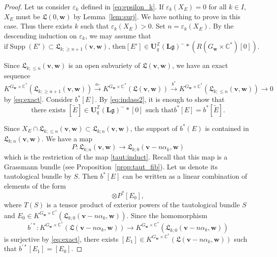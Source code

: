 \documentclass[12pt]{amsart}
\def\Bbb{\mathbb}
\def\frak{\mathfrak}
\theoremstyle{definition}
\theoremstyle{remark}
\numberwithin{equation}{subsection}
\newcommand{\lemref}[1]{Lemma~\ref{#1}}
\newcommand{\propref}[1]{Proposition~\ref{#1}}
\newcommand{\C}{{\Bbb C}}
\newcommand{\Z}{{\Bbb Z}}
\newcommand{\La}{{\frak L}} %
\newcommand{\bv}{{\mathbf v}} %
\newcommand{\bw}{{\mathbf w}} %
\newcommand{\Uli}{{\mathbf U}^{\Z}_q({\mathbf L}\mathfrak g)}
\begin{document}
\begin{proof}
Let us consider $\varepsilon_k$ defined in \eqref{eq:epsilon_k}. If
$\varepsilon_k(X_E) = 0$ for all $k\in I$, $X_E$ must be $\La(0,\bw)$
by \lemref{lem:surj}. We have nothing to prove in this case.  Thus
there exists $k$ such that $\varepsilon_k(X_E) > 0$. Set $n =
\varepsilon_k(X_E)$.
By the descending induction on $\varepsilon_k$, we may assume that
\begin{equation}
\label{eq:indass2}
\text{if
$\operatorname{Supp}(E')\subset \La_{k;\ge n+1}(\bv,\bw)$, then
$[E']\in \Uli^-\ast\left(R(G_\bw\times\C^*)[0]\right)$.}
\end{equation}

Since $\La_{k;\le n}(\bv,\bw)$ is an open
subvariety of $\La(\bv,\bw)$, we have an exact sequence
\begin{equation*}
   K^{G_\bw\times\C^*}(\La_{k;\ge n+1}(\bv,\bw))
    \xrightarrow{a_*}
   K^{G_\bw\times\C^*}(\La(\bv,\bw))
    \xrightarrow{b^*}
   K^{G_\bw\times\C^*}(\La_{k;\le n}(\bv,\bw))
    \to 0
\end{equation*}
by \eqref{eq:exact}.
%
Consider $b^*[E]$.
By \eqref{eq:indass2}, it is enough to show that
\begin{equation}
\label{eq:to_show}
\text{there exists $[\widetilde E]\in\Uli^-\ast[0]$ such that
$b^*[E] = b^*[\widetilde E]$.}
\end{equation}

Since $X_E\cap \La_{k;\le n}(\bv,\bw)\subset \La_{k;n}(\bv,\bw)$, the
support of $b^*(E)$ is contained in $\La_{k;n}(\bv,\bw)$.
We have a map
\begin{equation*}
   P\colon \La_{k;n}(\bv,\bw) \to
     \La_{k;0}(\bv-n\alpha_k,\bw)
\end{equation*}
which is the restriction of the map \eqref{taut:induct}.
Recall that this map is a Grassmann bundle (see
\propref{prop:taut_fib}).
Let us denote its tautological bundle by $S$.
%
Then $b^*[E]$ can be written as a linear combination of elements of
the form
\begin{equation*}
   [T(S)]\otimes P^* [E_0],
\end{equation*}
where $T(S)$ is a tensor product of exterior powers of the tautological
bundle $S$ and 
$E_0\in K^{G_\bw\times\C^*}(\La_{k;0}(\bv-n\alpha_k,\bw))$.
Since the homomorphism
\[
b^{\prime*}\colon K^{G_\bw\times\C^*}(\La(\bv-n\alpha_k,\bw))\to
K^{G_\bw\times\C^*}(\La_{k;0}(\bv-n\alpha_k,\bw))
\]
is surjective by \eqref{eq:exact}, there exists
$[E_1]\in K^{G_\bw\times\C^*}(\La(\bv-n\alpha_k,\bw))$ such
that $b^{\prime*}[E_1] = [E_0]$.


\end{proof}
\end{document}
